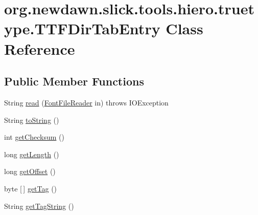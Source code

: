 \hypertarget{classorg_1_1newdawn_1_1slick_1_1tools_1_1hiero_1_1truetype_1_1_t_t_f_dir_tab_entry}{}\section{org.\+newdawn.\+slick.\+tools.\+hiero.\+truetype.\+T\+T\+F\+Dir\+Tab\+Entry Class Reference}
\label{classorg_1_1newdawn_1_1slick_1_1tools_1_1hiero_1_1truetype_1_1_t_t_f_dir_tab_entry}
\subsection*{Public Member Functions}
\begin{DoxyCompactItemize}
\item 
String \mbox{\hyperlink{classorg_1_1newdawn_1_1slick_1_1tools_1_1hiero_1_1truetype_1_1_t_t_f_dir_tab_entry_ae3c59df627d61204b187beea3c802654}{read}} (\mbox{\hyperlink{classorg_1_1newdawn_1_1slick_1_1tools_1_1hiero_1_1truetype_1_1_font_file_reader}{Font\+File\+Reader}} in)  throws I\+O\+Exception 
\item 
String \mbox{\hyperlink{classorg_1_1newdawn_1_1slick_1_1tools_1_1hiero_1_1truetype_1_1_t_t_f_dir_tab_entry_a2f3e98d83d98f93e243dd0e95edb7528}{to\+String}} ()
\item 
int \mbox{\hyperlink{classorg_1_1newdawn_1_1slick_1_1tools_1_1hiero_1_1truetype_1_1_t_t_f_dir_tab_entry_afb20df096b7369d2a765b6af88b5d7e9}{get\+Checksum}} ()
\item 
long \mbox{\hyperlink{classorg_1_1newdawn_1_1slick_1_1tools_1_1hiero_1_1truetype_1_1_t_t_f_dir_tab_entry_a9194cac4899626aeb2754d0230d85698}{get\+Length}} ()
\item 
long \mbox{\hyperlink{classorg_1_1newdawn_1_1slick_1_1tools_1_1hiero_1_1truetype_1_1_t_t_f_dir_tab_entry_a0f2fd5fe0eb35c92f8da70e025e14010}{get\+Offset}} ()
\item 
byte \mbox{[}$\,$\mbox{]} \mbox{\hyperlink{classorg_1_1newdawn_1_1slick_1_1tools_1_1hiero_1_1truetype_1_1_t_t_f_dir_tab_entry_a5ecc2f0acfe7bfaf8ed66c12b0879a2c}{get\+Tag}} ()
\item 
String \mbox{\hyperlink{classorg_1_1newdawn_1_1slick_1_1tools_1_1hiero_1_1truetype_1_1_t_t_f_dir_tab_entry_a8255e71e87e320046aabbfc6bbc43c98}{get\+Tag\+String}} ()
\end{DoxyCompactItemize}
